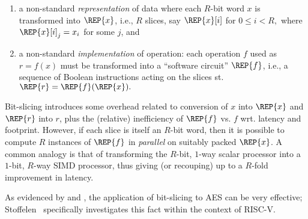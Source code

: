 \begin{enumerate}
\item a non-standard {\em representation}
      of data where
      each $R$-bit word $x$ is transformed into $\REP{x}$,
      i.e.,
      $R$ slices, say $\REP{x}[ i ]$ for
      $
      0 \leq i < R ,
      $
      where $\REP{x}[ i ]_j = x_i$ for some $j$,
      and
\item a non-standard {\em implementation}
      of operation:
      each operation $f$ used as
      $
          {r} =     {f}(     {x} )
      $
      must be transformed into a ``software circuit'' $\REP{f}$,
      i.e.,
      a sequence of Boolean instructions acting on the slices st.
      $
      \REP{r} = \REP{f}( \REP{x} ) .
      $
\end{enumerate}

\noindent
Bit-slicing introduces some overhead related to conversion of $x$ into
$\REP{x}$ and $\REP{r}$ into $r$, plus the (relative) inefficiency
of $\REP{f}$ vs. $f$ wrt. latency and footprint.
However, if each slice is itself an $R$-bit word, then it
is possible to compute $R$ instances of $\REP{f}$ in {\em parallel}
on suitably packed $\REP{x}$.
A common analogy is that of transforming the 
$R$-bit, $1$-way scalar processor 
into a 
$1$-bit, $R$-way SIMD   processor, 
thus giving (or recouping) up to a $R$-fold improvement in latency.

As evidenced by \cite{MatNak:07,Konighofer:08} and \cite{KasSch:09},
the application of bit-slicing to AES can be very effective;
Stoffelen~\cite[Section 3.1]{Stoffelen:19}
specifically investigates this fact within the context of RISC-V.

